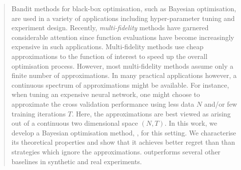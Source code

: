 
\begin{abstract}
Bandit methods for black-box optimisation, such as Bayesian optimisation, 
are used in a variety of applications including hyper-parameter tuning and
experiment design.
Recently, \emph{multi-fidelity} methods have garnered
considerable attention since function evaluations have become increasingly expensive in
such applications.
Multi-fidelity methods use cheap approximations to the function of
interest to speed up the overall optimisation process.
However, most multi-fidelity methods assume only a finite number of approximations.
In many practical applications however, a continuous spectrum of approximations might be
available.
For instance, when tuning an expensive neural network, one might choose to approximate the
cross validation performance using less data $N$ and/or few training iterations $T$.
Here, the approximations are best viewed as arising out of a continuous two dimensional
space $(N,T)$.
In this work, we develop a Bayesian optimisation method, \boca, for this setting.
We characterise its theoretical properties and show that it achieves better regret than
than strategies which ignore the approximations.
\bocas outperforms several other baselines in synthetic and real experiments.
\end{abstract}
